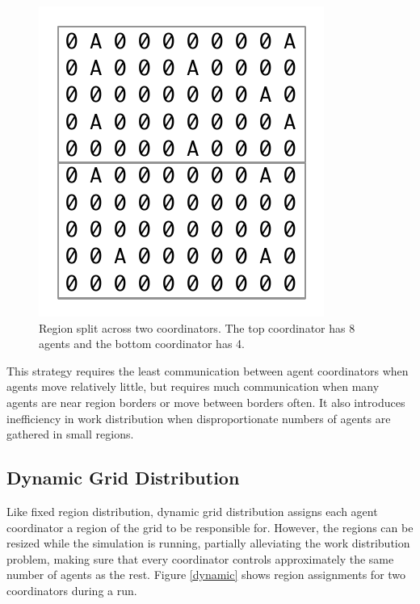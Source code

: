 \begin{figure}
    \begin{center}
        \includegraphics[scale=0.5]{figures/assign_region.pdf}
    \end{center}
    \caption{Region split across two coordinators. The top coordinator has 8 agents and the bottom coordinator has 4.}
    \label{fixed}
\end{figure}

This strategy requires the least communication between agent coordinators when agents move relatively little, but requires much communication when many agents are near region borders or move between borders often. It also introduces inefficiency in work distribution when disproportionate numbers of agents are gathered in small regions.

\subsection{Dynamic Grid Distribution}

Like fixed region distribution, dynamic grid distribution assigns each agent coordinator a region of the grid to be responsible for. However, the regions can be resized while the simulation is running, partially alleviating the work distribution problem, making sure that every coordinator controls approximately the same number of agents as the rest. Figure \ref{dynamic} shows region assignments for two coordinators during a run.

